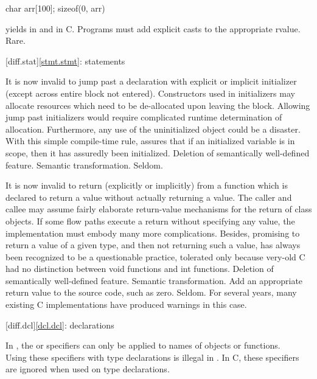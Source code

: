 \begin{codeblock}
char arr[100];
sizeof(0, arr)
\end{codeblock}

yields
in \Cpp{} and
in C.
\difficulty
Programs must add explicit casts to the appropriate rvalue.
\howwide
Rare.

[diff.stat]{\ref{stmt.stmt}: statements}

\change
It is now invalid to jump past a declaration with explicit or implicit initializer (except across entire block not entered).
\rationale
Constructors used in initializers may allocate
resources which need to be de-allocated upon leaving the
block.
Allowing jump past initializers would require
complicated runtime determination of allocation.
Furthermore, any use of the uninitialized object could be a
disaster.
With this simple compile-time rule, \Cpp{} assures that
if an initialized variable is in scope, then it has assuredly been
initialized.
\effect
Deletion of semantically well-defined feature.
\difficulty
Semantic transformation.
\howwide
Seldom.

\change
It is now invalid to return (explicitly or implicitly) from a function which is
declared to return a value without actually returning a value.
\rationale
The caller and callee may assume fairly elaborate
return-value mechanisms for the return of class objects.
If
some flow paths execute a return without specifying any value,
the implementation must embody many more complications.
Besides,
promising to return a value of a given type, and then not returning
such a value, has always been recognized to be a questionable
practice, tolerated only because very-old C had no distinction between
void  functions and  int  functions.
\effect
Deletion of semantically well-defined feature.
\difficulty
Semantic transformation.
Add an appropriate return value to the source code, such as zero.
\howwide
Seldom.
For several years, many existing C implementations have produced warnings in
this case.

[diff.dcl]{\ref{dcl.dcl}: declarations}

\change
In \Cpp{}, the  or  specifiers can only be applied to names of objects or functions.\\
Using these specifiers with type declarations is illegal in \Cpp{}.
In C, these specifiers are ignored when used on type declarations.

